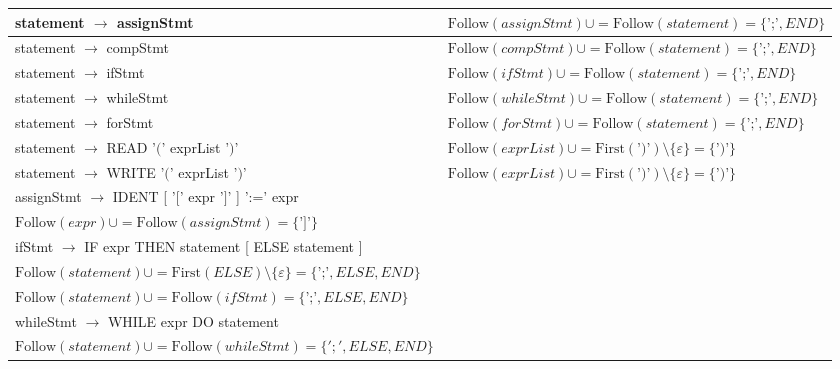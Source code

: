 \documentclass[8pt]{scrartcl}
\newcommand{\First}[1]{\mathrm{First}(#1)}
\newcommand{\Follow}[1]{\mathrm{Follow}(#1)}
\newcommand{\epsset}{\{\varepsilon\}}
\begin{document}
\begin{itemize}
\begin{tabular}{|l|l|}
                    \hline 
                    statement $\rightarrow$ assignStmt & $\Follow{assignStmt} \cup = \Follow{statement} = \{\text{';'}, END\}$\\
                    \hline
                    statement $\rightarrow$ compStmt & $\Follow{compStmt} \cup = \Follow{statement} = \{\text{';'}, END\}$\\
                    \hline
                    statement $\rightarrow$ ifStmt & $\Follow{ifStmt} \cup = \Follow{statement} = \{\text{';'}, END\}$\\
                    \hline
                    statement $\rightarrow$ whileStmt & $\Follow{whileStmt} \cup = \Follow{statement} = \{\text{';'}, END\}$\\
                    \hline
                    statement $\rightarrow$ forStmt & $\Follow{forStmt} \cup = \Follow{statement} = \{\text{';'}, END\}$\\
                    \hline
                    statement $\rightarrow$ READ '$($' exprList '$)$' & $\Follow{exprList} \cup = \First{\text{'$)$'}} \setminus \epsset = \{\text{'$)$'}\}$\\
                    \hline
                    statement $\rightarrow$ WRITE '$($' exprList '$)$' & $\Follow{exprList} \cup = \First{\text{'$)$'}} \setminus \epsset = \{\text{'$)$'}\}$\\
                    \hline
                    assignStmt $\rightarrow$ IDENT [ '$[$' expr '$]$' ] ':=' expr & \makecell[l]{$\Follow{expr} \cup = \First{\text{'$]$'}} \setminus \epsset = \{\text{'$]$'}\}$\\ $\Follow{expr} \cup = \Follow{assignStmt} = \{\text{'$]$'}\}$}\\
                    \hline
                    ifStmt $\rightarrow$ IF expr THEN statement [ ELSE statement ] & \makecell[l]{$\Follow{expr} \cup = \First{THEN} \setminus \epsset = \{\text{'$]$'}, THEN\}$\\ $\Follow{statement} \cup = \First{ELSE} \setminus \epsset = \{\text{';'}, ELSE, END\}$\\ $\Follow{statement} \cup = \Follow{ifStmt} = \{\text{';'}, ELSE, END\}$}\\
                    \hline
                    whileStmt $\rightarrow$ WHILE expr DO statement & \makecell[l]{$\Follow{expr} \cup = \First{DO} \setminus \epsset = \{\text{']'}, THEN, DO\}$\\ $\Follow{statement} \cup = \Follow{whileStmt} = \{';', ELSE, END\}$}\\
                    \hline

\end{tabular}
\end{itemize}
\end{document}
